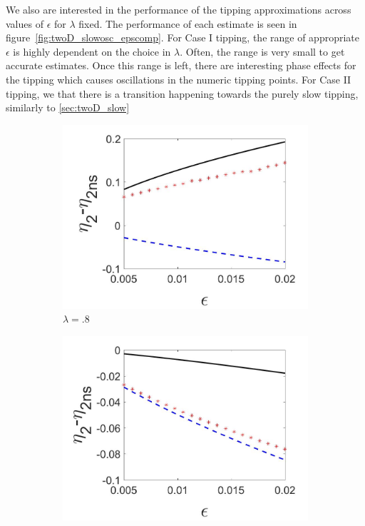 We also are interested in the performance of the tipping approximations across values of $\epsilon$ for $\lambda$ fixed. The performance of each estimate is seen in figure~\ref{fig:twoD_slowosc_epscomp}. For Case I tipping, the range of appropriate $\epsilon$ is highly dependent on the choice in $\lambda$. Often, the range is very small to get accurate estimates. Once this range is left, there are interesting phase effects for the tipping which causes oscillations in the numeric tipping points. For Case II tipping, we that there is a transition happening towards the purely slow tipping, similarly to \autoref{sec:twoD_slow}


\begin{figure}[H]
\centering
\begin{subfigure}{.5\textwidth}
  \centering
  \includegraphics[width=\linewidth]{twoD/slowosc_epscomp_mixed.jpg}
  \caption{$\lambda=.8$}
\end{subfigure}%
\begin{subfigure}{.5\textwidth}
  \centering
  \includegraphics[width=\linewidth]{twoD/slowosc_epscomp_slow.jpg}

\end{subfigure}
\end{figure}
